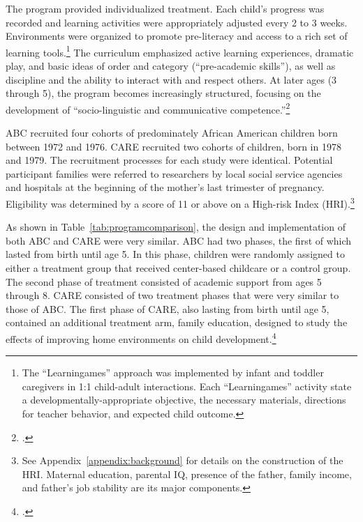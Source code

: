 The program provided individualized treatment. Each child's progress was recorded and learning activities were appropriately adjusted every 2 to 3 weeks. Environments were organized to promote pre-literacy and access to a rich set of learning tools.\footnote{The ``Learningames'' approach was implemented by infant and toddler caregivers in 1:1 child-adult interactions. Each ``Learningames'' activity state a developmentally-appropriate objective, the necessary materials, directions for teacher behavior, and expected child outcome.} The curriculum emphasized active learning experiences, dramatic play, and basic ideas of order and category (``pre-academic skills''), as well as discipline and the ability to interact with and respect others.  At later ages (3 through 5), the program becomes increasingly structured, focusing on the development of ``socio-linguistic and communicative competence.''\footnote{\citet{Ramey-et-al_1977_Intro-to-ABC, Haskins_1985_CD, Ramey_1981_Modification, Ramey_Campbell_1979_SR, Ramey_Smith_1977_AJMD, Ramey_McGinness_etal_1982_Abecedarianapproach, Sparling_Lewis_1979_BOOKLearninggamesFirstThree,Sparling_Lewis_1984_BOOKLearningGamesThreesFours}.}

ABC recruited four cohorts of predominately African American children born between 1972 and 1976. CARE recruited two cohorts of children, born in 1978 and 1979. The recruitment processes for each study were identical. Potential participant families were referred to researchers by local social service agencies and hospitals at the beginning of the mother's last trimester of pregnancy. Eligibility was determined by a score of 11 or above on a High-risk Index (HRI).\footnote{See Appendix~\ref{appendix:background} for details on the construction of the HRI. Maternal education, parental IQ, presence of the father, family income, and father's job stability are its major components.}

As shown in Table~\ref{tab:programcomparison}, the design and implementation of both ABC and CARE were very similar. ABC had two phases, the first of which lasted from birth until age 5. In this phase, children were randomly assigned to either a treatment group that received center-based childcare or a control group. The second phase of treatment consisted of academic support from ages 5 through 8. CARE consisted of two treatment phases that were very similar to those of ABC. The first phase of CARE, also lasting from birth until age 5, contained an additional treatment arm, family education, designed to study the effects of improving home environments on child development.\footnote{\citet{Wasik_Ramey_etal_1990_CD}.}

